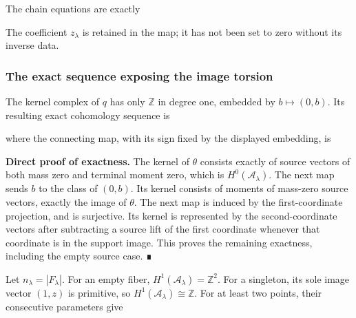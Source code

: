 The chain equations are exactly


The coefficient \(z_\lambda\) is retained in the map; it has not been
set to zero without its inverse data.

\subsubsection{The exact sequence exposing the image torsion}

The kernel complex of \(q\) has only \(\mathbb Z\) in degree one,
embedded by \(b\mapsto(0,b)\). Its resulting exact cohomology sequence
is


where the connecting map, with its sign fixed by the displayed
embedding, is


\textbf{Direct proof of exactness.} The kernel of \(\theta\) consists
exactly of source vectors of both mass zero and terminal moment zero,
which is \(H^0(\mathcal A_\lambda)\). The next map sends \(b\) to the
class of \((0,b)\). Its kernel consists of moments of mass-zero source
vectors, exactly the image of \(\theta\). The next map is induced by the
first-coordinate projection, and is surjective. Its kernel is
represented by the second-coordinate vectors after subtracting a source
lift of the first coordinate whenever that coordinate is in the support
image. This proves the remaining exactness, including the empty source
case. ∎

Let \(n_\lambda=|F_\lambda|\). For an empty fiber,
\(H^1(\mathcal A_\lambda)=\mathbb Z^2\). For a singleton, its sole image
vector \((1,z)\) is primitive, so
\(H^1(\mathcal A_\lambda)\cong\mathbb Z\). For at least two points,
their consecutive parameters give


